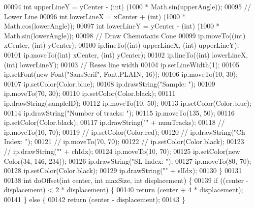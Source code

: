 \begin{DoxyCode}
00094     \textcolor{keywordtype}{int} upperLineY = yCenter - (int) (1000 * Math.sin(upperAngle));
00095     \textcolor{comment}{// Lower Line}
00096     \textcolor{keywordtype}{int} lowerLineX = xCenter + (int) (1000 * Math.cos(lowerAngle));
00097     \textcolor{keywordtype}{int} lowerLineY = yCenter - (int) (1000 * Math.sin(lowerAngle));
00098     \textcolor{comment}{// Draw Chemotaxis Cone}
00099     ip.moveTo((\textcolor{keywordtype}{int}) xCenter, (\textcolor{keywordtype}{int}) yCenter);
00100     ip.lineTo((\textcolor{keywordtype}{int}) upperLineX, (\textcolor{keywordtype}{int}) upperLineY);
00101     ip.moveTo((\textcolor{keywordtype}{int}) xCenter, (\textcolor{keywordtype}{int}) yCenter);
00102     ip.lineTo((\textcolor{keywordtype}{int}) lowerLineX, (\textcolor{keywordtype}{int}) lowerLineY);
00103     \textcolor{comment}{// Reses line width}
00104     ip.setLineWidth(1);
00105     ip.setFont(\textcolor{keyword}{new} Font(\textcolor{stringliteral}{"SansSerif"}, Font.PLAIN, 16));
00106     ip.moveTo(10, 30);
00107     ip.setColor(Color.blue);
00108     ip.drawString(\textcolor{stringliteral}{"Sample: "});
00109     ip.moveTo(70, 30);
00110     ip.setColor(Color.black);
00111     ip.drawString(sampleID);
00112     ip.moveTo(10, 50);
00113     ip.setColor(Color.blue);
00114     ip.drawString(\textcolor{stringliteral}{"Number of tracks: "});
00115     ip.moveTo(135, 50);
00116     ip.setColor(Color.black);
00117     ip.drawString(\textcolor{stringliteral}{""} + numTracks);
00118 \textcolor{comment}{//    ip.moveTo(10, 70);}
00119 \textcolor{comment}{//    ip.setColor(Color.red);}
00120 \textcolor{comment}{//    ip.drawString("Ch-Index: ");}
00121 \textcolor{comment}{//    ip.moveTo(70, 70);}
00122 \textcolor{comment}{//    ip.setColor(Color.black);}
00123 \textcolor{comment}{//    ip.drawString("" + chIdx);}
00124     ip.moveTo(10, 70);
00125     ip.setColor(\textcolor{keyword}{new} Color(34, 146, 234));
00126     ip.drawString(\textcolor{stringliteral}{"SL-Index: "});
00127     ip.moveTo(80, 70);
00128     ip.setColor(Color.black);
00129     ip.drawString(\textcolor{stringliteral}{""} + slIdx);
00130   \}
00131 
00138   \textcolor{keywordtype}{int} doOffset(\textcolor{keywordtype}{int} center, \textcolor{keywordtype}{int} maxSize, \textcolor{keywordtype}{int} displacement) \{
00139     \textcolor{keywordflow}{if} ((center - displacement) < 2 * displacement) \{
00140       \textcolor{keywordflow}{return} (center + 4 * displacement);
00141     \} \textcolor{keywordflow}{else} \{
00142       \textcolor{keywordflow}{return} (center - displacement);
00143     \}

\end{DoxyCode}
